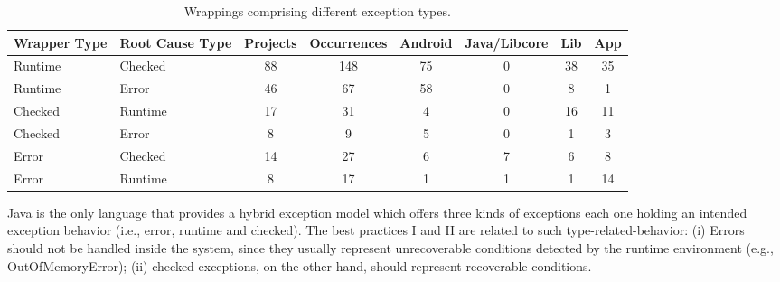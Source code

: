 \documentclass[conference]{IEEEtran}
\begin{document}
\begin{table}
  \centering
  \begin{tabular}{llcccccc}
    \hline
    \bfseries{Wrapper Type}  &  \bfseries{Root Cause Type} &  \bfseries{Projects}  &  \bfseries{Occurrences} & \textsf{Android} & \textsf{Java/Libcore} & \textsf{Lib} & \textsf{App}  \\
    \hline
      
      Runtime &  Checked   & 88 & 148 &  75  &  0   & 38 &  35 \\
      Runtime   &  Error   & 46  &  67    &  58  &  0   & 8  &  1   \\      
      Checked &  Runtime   & 17  & 31 & 4 &  0  & 16 &  11 \\
      Checked & Error      & 8 &  9  & 5  &  0  &  1 &  3  \\
      Error & Checked      & 14 &  27 &  6  &  7  &  6 &   8    \\
      Error & Runtime     & 8  &  17   & 1 &  1  & 1 &  14    \\

  \hline
  \end{tabular}
\caption{Wrappings comprising different exception types.}
\label{tab:wrappingandroid}
\end{table}

Java is the only language that provides a hybrid exception model 
which offers three kinds of exceptions each one holding an intended exception behavior (i.e., error, 
runtime and checked). The best practices I and II are related to such type-related-behavior: 
(i) Errors should not be handled inside the system, since they usually represent unrecoverable conditions detected 
by the runtime environment (e.g.,  OutOfMemoryError); (ii) checked exceptions, on the other hand, should represent 
recoverable conditions. 
\end{document}
